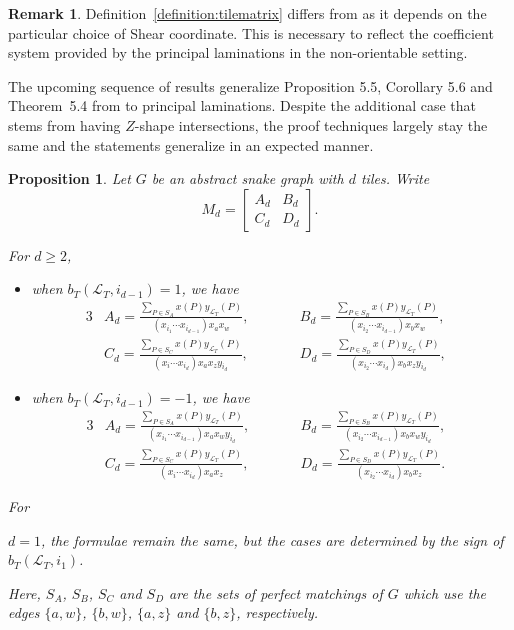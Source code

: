 \documentclass[pdftex]{sigma}
\numberwithin{equation}{section}
\newtheorem{Proposition}[Theorem]{Proposition}
\theoremstyle{definition}
\newtheorem{Remark}[Theorem]{Remark}
\begin{document}
\begin{Remark}
Definition~\ref{definition:tilematrix} differs from \cite{MW13} as it depends on the particular choice of Shear coordinate. This is necessary to reflect the coefficient system provided by the principal laminations in the non-orientable setting.
\end{Remark}

The upcoming sequence of results generalize Proposition 5.5, Corollary 5.6 and Theorem~5.4 from \cite{MW13} to principal laminations. Despite the additional case that stems from having $Z$-shape intersections, the proof techniques largely stay the same and the statements generalize in an expected manner.

\begin{Proposition}\label{prop:snakematrix}
Let $G$ be an abstract snake graph with $d$ tiles. Write \[M_d=\begin{bmatrix}
A_d & B_d\\
C_d & D_d
\end{bmatrix}.\]

For $d\geq 2$,{\samepage
\begin{itemize}\itemsep=0pt
\item when $b_{T}(\mathcal{L}_{T}, {i_{d-1}})=1$, we have
\begin{alignat*}{3}
& A_d = \frac{\sum_{P\in S_A}x(P)y_{\mathcal{L}_T}(P)}{(x_{i_1}\cdots x_{i_{d-1}})x_ax_w}, \qquad && B_d = \frac{\sum_{P\in S_B}x(P)y_{\mathcal{L}_T}(P)}{(x_{i_2}\cdots x_{i_{d-1}})x_bx_w},&\\
& C_d = \frac{\sum_{P\in S_C}x(P)y_{\mathcal{L}_T}(P)}{(x_{i}\cdots x_{i_d})x_ax_zy_{i_d}}, \qquad && D_d = \frac{\sum_{P\in S_D}x(P)y_{\mathcal{L}_T}(P)}{(x_{i_2}\cdots x_{i_{d}})x_bx_zy_{i_d}},&
\end{alignat*}
\item when $b_{T}(\mathcal{L}_{T}, i_{d-1})=-1$, we have
\begin{alignat*}{3}
& A_d = \frac{\sum_{P\in S_A}x(P)y_{\mathcal{L}_T}(P)}{(x_{i_1}\cdots x_{i_{d-1}})x_ax_wy_{i_d}} ,\qquad&& B_d = \frac{\sum_{P\in S_B}x(P)y_{\mathcal{L}_T}(P)}{(x_{i_2}\cdots x_{i_{d-1}})x_bx_w y_{i_d}},&\\
& C_d = \frac{\sum_{P\in S_C}x(P)y_{\mathcal{L}_T}(P)}{(x_{i}\cdots x_{i_d})x_ax_z} ,\qquad&& D_d = \frac{\sum_{P\in S_D}x(P)y_{\mathcal{L}_T}(P)}{(x_{i_2}\cdots x_{i_{d}})x_bx_z}.&
\end{alignat*}
\end{itemize}
For} $d=1$, the formulae remain the same, but the cases are determined by the sign of $b_T(\mathcal{L}_T, i_1)$.

Here, $S_A$, $S_B$, $S_C$ and $S_D$ are the sets of perfect matchings of $G$ which use the edges $\{a, w\}$, $\{b, w\}$, $\{a, z\}$ and $\{b, z\}$, respectively.
\end{Proposition}
\end{document}
